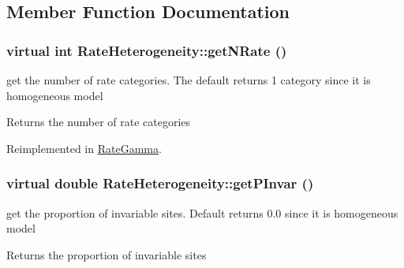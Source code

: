 \subsection{Member Function Documentation}
\hypertarget{classRateHeterogeneity_ac61808650eab5d2187f3cc9b20694f80}{
\subsubsection[{getNRate}]{\setlength{\rightskip}{0pt plus 5cm}virtual int RateHeterogeneity::getNRate ()}}
\label{classRateHeterogeneity_ac61808650eab5d2187f3cc9b20694f80}
get the number of rate categories. The default returns 1 category since it is homogeneous model \begin{DoxyReturn}{Returns}
the number of rate categories 
\end{DoxyReturn}


Reimplemented in \hyperlink{classRateGamma_a115dac63aaa8fc7ac256304506ef3307}{RateGamma}.\hypertarget{classRateHeterogeneity_ada76d84ed7f66ddde02734d9c72f4e7b}{
\subsubsection[{getPInvar}]{\setlength{\rightskip}{0pt plus 5cm}virtual double RateHeterogeneity::getPInvar ()}}
\label{classRateHeterogeneity_ada76d84ed7f66ddde02734d9c72f4e7b}
get the proportion of invariable sites. Default returns 0.0 since it is homogeneous model \begin{DoxyReturn}{Returns}
the proportion of invariable sites 
\end{DoxyReturn}


